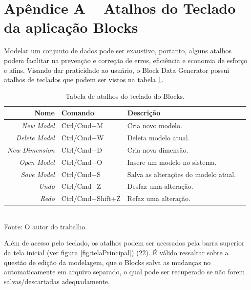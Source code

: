 \documentclass[
	12pt,				%
	openright,			%
	oneside,			%
	a4paper,			%
	english,			%
	brazil				%
	]{abntex2}
\begin{document}
\chapter*{Apêndice A -- Atalhos do Teclado da aplicação Blocks}
			Modelar um conjunto de dados pode ser exaustivo, portanto, alguns atalhos podem facilitar na prevenção e correção de erros, eficiência e economia de esforço e afins.
			Visando dar praticidade ao usuário, o Block Data Generator possui atalhos de teclados que podem ser vistos na tabela \ref{table: comandos do teclado}.
				\begin{table}[h]
					\centering
					\caption{Tabela de atalhos do teclado do Blocks.}
					\vspace{0.5cm}
					\label{table: comandos do teclado}
					\begin{tabular}{r|lll}
					
						Nome                 & Comando          & Descrição                           \\ %
						\hline                                  %
						\emph{New Model}     & Ctrl/Cmd+M       & Cria novo modelo.                   \\
						\emph{Delete Model}  & Ctrl/Cmd+W       & Deleta modelo atual.                \\
						\emph{New Dimension} & Ctrl/Cmd+D       & Cria nova dimensão.                 \\
						\emph{Open Model}    & Ctrl/Cmd+O       & Insere um modelo no sistema.        \\
						\emph{Save Model}    & Ctrl/Cmd+S       & Salva as alterações do modelo atual.\\
						\emph{Undo}          & Ctrl/Cmd+Z       & Desfaz uma alteração.               \\
						\emph{Redo}          & Ctrl/Cmd+Shift+Z & Refaz uma alteração.                \\
			
					\end{tabular}
					\bigskip
					\\
					\footnotesize Fonte: O autor do trabalho.
				\end{table}
			\par
			
			Além de acesso pelo teclado, os atalhos podem ser acessados pela barra superior da tela inicial (ver figura \ref{fig:telaPrincipal}) (22).
			É válido ressaltar sobre a questão de edição da modelagem, que o Blocks salva as mudanças no automaticamente em arquivo separado, o qual pode ser recuperado se não forem salvas/descartadas adequadamente.
\end{document}
